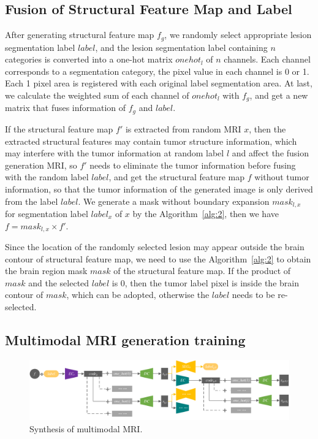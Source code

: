 \documentclass[letterpaper]{article} %
\begin{document}
\subsection{Fusion of Structural Feature Map and Label}

After generating structural feature map $f_g$, we randomly select appropriate lesion segmentation label $label$, and the lesion segmentation label containing $n$ categories is converted into a one-hot matrix $onehot_l$ of $n$ channels. Each channel corresponds to a segmentation category, the pixel value in each channel is 0 or 1. Each 1 pixel area is registered with each original label segmentation area. At last, we calculate the weighted sum of each channel of $onehot_l$ with $f_g$, and get a new matrix that fuses information of $f_g$ and $label$.

If the structural feature map $f'$ is extracted from random MRI $x$, then the extracted structural features may contain tumor structure information, which may interfere with the tumor information at random label $l$ and affect the fusion generation MRI, so $f'$ needs to eliminate the tumor information before fusing with the random label $label$, and get the structural feature map $f$ without tumor information, so that the tumor information of the generated image is only derived from the label $label$. We generate a mask without boundary expansion $mask_{l,x}$ for segmentation label $label_x$ of $x$ by the Algorithm~\ref{alg:2}, then we have $f=mask_{l,x}\times f'$.

Since the location of the randomly selected lesion may appear outside the brain contour of structural feature map, we need to use the Algorithm~\ref{alg:2} to obtain the brain region mask $mask$ of the structural feature map. If the product of $mask$ and the selected $label$ is 0, then the tumor label pixel is inside the brain contour of $mask$, which can be adopted, otherwise the $label$ needs to be re-selected.

\subsection{Multimodal MRI generation training}
\begin{figure}
	\centering
	\includegraphics[width=0.98\columnwidth]{figures/mm_mri_generate}
	\caption{Synthesis of multimodal MRI.}
	\label{mm_mri_generate}
\end{figure}
\end{document}
